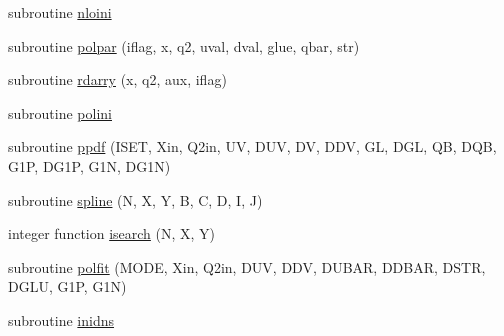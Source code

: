 \begin{DoxyCompactItemize}
\item 
subroutine \hyperlink{polpdf_8f_a0cb6a9f9f33545f3057d9b115f5d055c}{nloini}
\item 
subroutine \hyperlink{polpdf_8f_a3e3afd88ba8363455b22fd4fb5727df6}{polpar} (iflag, x, q2, uval, dval, glue, qbar, str)
\item 
subroutine \hyperlink{polpdf_8f_aa6768afb7e596138ae832b1324adb155}{rdarry} (x, q2, aux, iflag)
\item 
subroutine \hyperlink{polpdf_8f_ad28ff77cf4e713fdb1d299d0a95a3fd3}{polini}
\item 
subroutine \hyperlink{polpdf_8f_a2fb724c2930167235703c922c529999c}{ppdf} (I\+S\+E\+T, Xin, Q2in, U\+V, D\+U\+V, D\+V, D\+D\+V, G\+L, D\+G\+L, Q\+B, D\+Q\+B, G1\+P, D\+G1\+P, G1\+N, D\+G1\+N)
\item 
subroutine \hyperlink{polpdf_8f_a45eb8bcc97d5f2c125774ad51b11de67}{spline} (N, X, Y, B, C, D, I, J)
\item 
integer function \hyperlink{polpdf_8f_a0120bfb26b8b3f5c47eea5ad05daddcb}{isearch} (N, X, Y)
\item 
subroutine \hyperlink{polpdf_8f_a24e333d1b3a2fb23b03ecbc8498bbc29}{polfit} (M\+O\+D\+E, Xin, Q2in, D\+U\+V, D\+D\+V, D\+U\+B\+A\+R, D\+D\+B\+A\+R, D\+S\+T\+R, D\+G\+L\+U, G1\+P, G1\+N)
\item 
subroutine \hyperlink{polpdf_8f_a9195a0db206c1f7311e8a0b5d6bf4e66}{inidns}
\end{DoxyCompactItemize}


